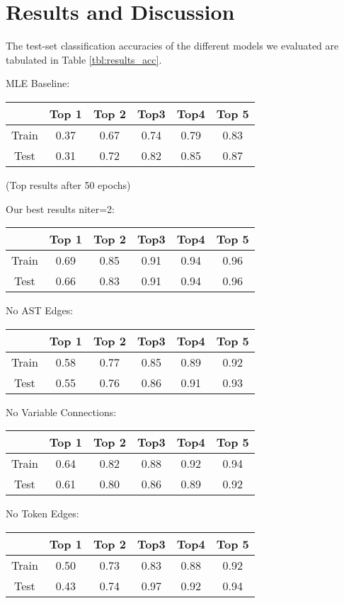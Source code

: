\section{Results and Discussion}
\label{sec:results}
The test-set classification accuracies of the different models we evaluated are tabulated in Table \ref{tbl:results_acc}.

MLE Baseline:
\begin{tabular}{c|ccccc}
  & Top 1 & Top 2 & Top3 & Top4 & Top 5 \\
  \hline
  Train & 0.37 & 0.67 & 0.74 & 0.79 & 0.83 \\
  Test & 0.31 & 0.72 & 0.82 & 0.85 & 0.87
\end{tabular}

(Top results after 50 epochs)

Our best results niter=2:
\begin{tabular}{c|ccccc}
  & Top 1 & Top 2 & Top3 & Top4 & Top 5 \\
  \hline
  Train & 0.69 & 0.85 & 0.91 & 0.94 & 0.96 \\
  Test & 0.66 & 0.83 & 0.91 & 0.94 & 0.96
\end{tabular}

No AST Edges:
\begin{tabular}{c|ccccc}
  & Top 1 & Top 2 & Top3 & Top4 & Top 5 \\
  \hline
  Train & 0.58 & 0.77 & 0.85 & 0.89 & 0.92 \\
  Test & 0.55 & 0.76 & 0.86 & 0.91 & 0.93
\end{tabular}

No Variable Connections:
\begin{tabular}{c|ccccc}
  & Top 1 & Top 2 & Top3 & Top4 & Top 5 \\
  \hline
  Train & 0.64 & 0.82 & 0.88 & 0.92 & 0.94 \\
  Test & 0.61 & 0.80 & 0.86 & 0.89 & 0.92
\end{tabular}

No Token Edges:
\begin{tabular}{c|ccccc}
  & Top 1 & Top 2 & Top3 & Top4 & Top 5 \\
  \hline
  Train & 0.50 & 0.73 & 0.83 & 0.88 & 0.92 \\
  Test & 0.43 & 0.74 & 0.97 & 0.92 & 0.94
\end{tabular}


